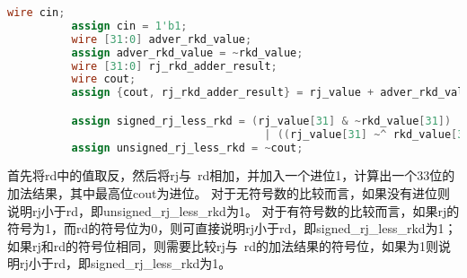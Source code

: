 \documentclass[12pt,a4paper]{article}
\begin{document}
\begin{itemize}
\begin{lstlisting}[language=Verilog]
          wire cin;
          assign cin = 1'b1;
          wire [31:0] adver_rkd_value;
          assign adver_rkd_value = ~rkd_value;
          wire [31:0] rj_rkd_adder_result;
          wire cout;
          assign {cout, rj_rkd_adder_result} = rj_value + adver_rkd_value + cin;

          assign signed_rj_less_rkd = (rj_value[31] & ~rkd_value[31])
                                        | ((rj_value[31] ~^ rkd_value[31]) & rj_rkd_adder_result[31]);
          assign unsigned_rj_less_rkd = ~cout;  
          \end{lstlisting}
          首先将rd中的值取反，然后将rj与~rd相加，并加入一个进位1，计算出一个33位的加法结果，其中最高位cout为进位。
          对于无符号数的比较而言，如果没有进位则说明rj小于rd，即unsigned\_rj\_less\_rkd为1。
          对于有符号数的比较而言，如果rj的符号为1，而rd的符号位为0，则可直接说明rj小于rd，即signed\_rj\_less\_rkd为1；
          如果rj和rd的符号位相同，则需要比较rj与~rd的加法结果的符号位，如果为1则说明rj小于rd，即signed\_rj\_less\_rkd为1。
        

\end{itemize}
\end{document}

